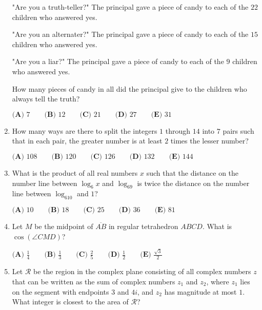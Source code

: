 \documentclass{article}
\begin{document}
\begin{enumerate}[label=\arabic*., itemsep=0.5em]
"Are you a truth-teller?" The principal gave a piece of candy to each of the \(22\)
children who answered yes.

"Are you an alternater?" The principal gave a piece of candy to each of the \(15\)
children who answered yes.

"Are you a liar?" The principal gave a piece of candy to each of the \(9\) children who
answered yes.

How many pieces of candy in all did the principal give to the children who always
tell the truth?

\(\textbf{(A) } 7 \qquad \textbf{(B) } 12 \qquad \textbf{(C) } 21 \qquad \textbf{(D) } 27 \qquad \textbf{(E) } 31\)\par \vspace{0.5em}\item How many ways are there to split the integers \(1\) through \(14\) into \(7\) pairs such that in each pair, the greater number is at least \(2\) times the lesser number?

\(\textbf{(A) } 108 \qquad \textbf{(B) } 120 \qquad \textbf{(C) } 126 \qquad \textbf{(D) } 132 \qquad \textbf{(E) } 144\)\par \vspace{0.5em}\item What is the product of all real numbers \(x\) such that the distance on the number line between \(\log_6x\) and \(\log_69\) is twice the distance on the number line between \(\log_610\) and \(1\)?

\(\textbf{(A) } 10 \qquad \textbf{(B) } 18 \qquad \textbf{(C) } 25 \qquad \textbf{(D) } 36 \qquad \textbf{(E) } 81\)\par \vspace{0.5em}\item Let \(M\) be the midpoint of \(\overline{AB}\) in regular tetrahedron \(ABCD\). What is \(\cos(\angle CMD)\)?

\(\textbf{(A) } \frac14 \qquad \textbf{(B) } \frac13 \qquad \textbf{(C) } \frac25 \qquad \textbf{(D) } \frac12 \qquad \textbf{(E) } \frac{\sqrt{3}}{2}\)\par \vspace{0.5em}\item Let \(\mathcal{R}\) be the region in the complex plane consisting of all complex numbers \(z\) that can be written as the sum of complex numbers \(z_1\) and \(z_2\), where \(z_1\) lies on the segment with endpoints \(3\) and \(4i\), and \(z_2\) has magnitude at most \(1\). What integer is closest to the area of \(\mathcal{R}\)?  


\end{enumerate}
\end{document}
